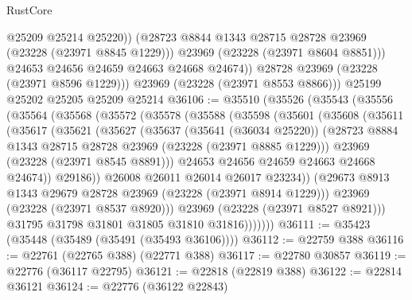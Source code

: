 \begin{lexlean}{RustCore}
\begin{coremodule}
                  @25209
                  @25214
                  @25220))
              (@28723 @8844 @1343 @28715 @28728 @23969 (@23228 (@23971 @8845 @1229)))
              @23969
              (@23228 (@23971 @8604 @8851)))
            @24653
            @24656
            @24659
            @24663
            @24668
            @24674))
        @28728
        @23969
        (@23228 (@23971 @8596 @1229)))
      @23969
      (@23228 (@23971 @8553 @8866)))
    @25199
    @25202
    @25205
    @25209
    @25214
@36106 := @35510
    (@35526
      (@35543
        (@35556
          (@35564
            (@35568
              (@35572
                (@35578
                  (@35588
                    (@35598
                      (@35601
                        (@35608
                          (@35611
                            (@35617
                              (@35621
                                (@35627
                                  (@35637
                                    (@35641 (@36034 @25220))
                                    (@28723
                                      @8884
                                      @1343
                                      @28715
                                      @28728
                                      @23969
                                      (@23228 (@23971 @8885 @1229)))
                                    @23969
                                    (@23228 (@23971 @8545 @8891)))
                                  @24653
                                  @24656
                                  @24659
                                  @24663
                                  @24668
                                  @24674))
                              @29186))
                          @26008
                          @26011
                          @26014
                          @26017
                          @23234))
                      (@29673 @8913 @1343 @29679 @28728 @23969 (@23228 (@23971 @8914 @1229)))
                      @23969
                      (@23228 (@23971 @8537 @8920)))
                    @23969
                    (@23228 (@23971 @8527 @8921)))
                  @31795
                  @31798
                  @31801
                  @31805
                  @31810
                  @31816)))))))
@36111 := @35423 (@35448 (@35489 (@35491 (@35493 @36106))))
@36112 := @22759 @388
@36116 := @22761 (@22765 @388) (@22771 @388)
@36117 := @22780 @30857
@36119 := @22776 (@36117 @22795)
@36121 := @22818 (@22819 @388)
@36122 := @22814 @36121
@36124 := @22776 (@36122 @22843)

\end{coremodule}
\end{lexlean}
